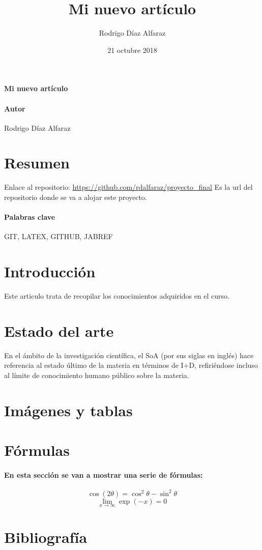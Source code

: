 \documentclass[a4paper,11pt]{article}
\begin{document}
\title{Mi nuevo artículo} 
\author{Rodrigo Díaz Alfaraz}
\date{21 octubre 2018}
\maketitle

\paragraph*{Mi nuevo artículo}

\paragraph*{Autor}
Rodrigo Díaz Alfaraz

\section*{Resumen} 
Enlace al repositorio:
\url{https://github.com/rdalfaraz/proyecto_final} Es la url del repositorio donde se va a alojar este proyecto.
\paragraph*{Palabras clave}

GIT, LATEX, GITHUB, JABREF

\section*{Introducción}
Este articulo trata de recopilar los conocimientos adquiridos en el curso. 

\section*{Estado del arte}
En el ámbito de la investigación científica, el SoA (por sus siglas en inglés) hace referencia al estado último de la materia en términos de I+D, refiriéndose incluso al límite de conocimiento humano público sobre la materia.


\section*{Imágenes y tablas}
\section*{Fórmulas}
\paragraph{En esta sección se van a mostrar una serie de fórmulas:}
$$\cos (2\theta)= \cos^2 \theta - \sin^2 \theta$$
\linebreak
$$\lim\limits_{x \to \infty} \exp(-x) = 0$$

\section*{Bibliografía}
\end{document}
